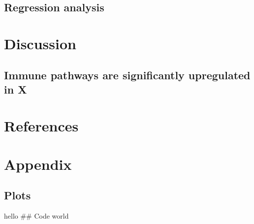 \documentclass[
  parskip,
  oneside]{scrreprt}
\newlength{\cslhangindent}
\newlength{\cslentryspacingunit} %
\newenvironment{CSLReferences}[2] %
 {%
  \setlength{\parindent}{0pt}
  \ifodd #1
  \let\oldpar\par
  \def\par{\hangindent=\cslhangindent\oldpar}
  \fi
  \setlength{\parskip}{#2\cslentryspacingunit}
 }%
 {}
\begin{document}
\hypertarget{regression-analysis}{%
\section{Regression analysis}\label{regression-analysis}}

\hypertarget{discussion}{%
\chapter{Discussion}\label{discussion}}

\hypertarget{immune-pathways-are-significantly-upregulated-in-x}{%
\section{Immune pathways are significantly upregulated in
X}\label{immune-pathways-are-significantly-upregulated-in-x}}

\hypertarget{references}{%
\chapter{References}\label{references}}

\hypertarget{refs}{}
\begin{CSLReferences}{0}{0}
\end{CSLReferences}

\hypertarget{appendix}{%
\chapter{Appendix}\label{appendix}}

\hypertarget{plots}{%
\section{Plots}\label{plots}}

hello \#\# Code world
\end{document}
